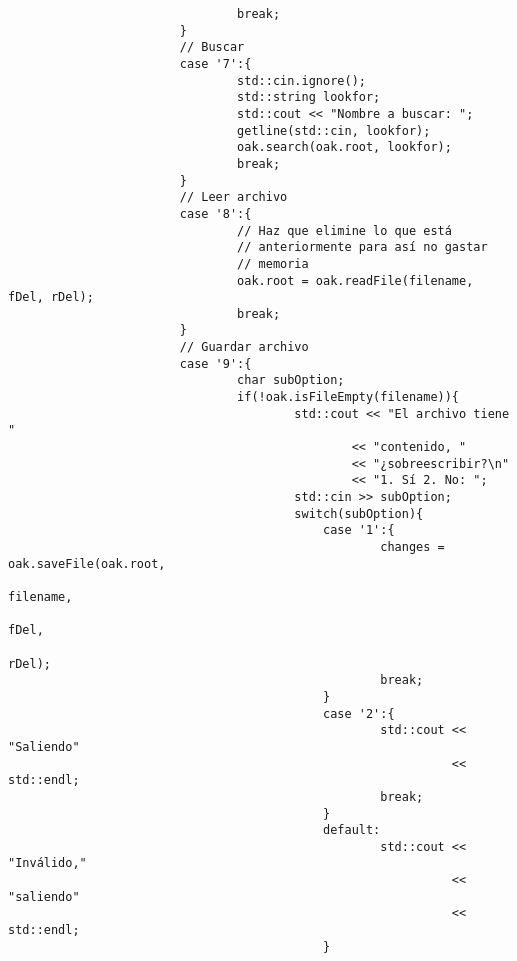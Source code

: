 \documentclass[11pt]{article}
\begin{document}
\begin{verbatim}
                                break;
                        }
                        // Buscar
                        case '7':{
                                std::cin.ignore();
                                std::string lookfor;
                                std::cout << "Nombre a buscar: ";
                                getline(std::cin, lookfor);
                                oak.search(oak.root, lookfor);
                                break;
                        }
                        // Leer archivo
                        case '8':{
                                // Haz que elimine lo que está
                                // anteriormente para así no gastar
                                // memoria
                                oak.root = oak.readFile(filename, fDel, rDel);
                                break;
                        }
                        // Guardar archivo
                        case '9':{
                                char subOption;
                                if(!oak.isFileEmpty(filename)){
                                        std::cout << "El archivo tiene "
                                                << "contenido, "
                                                << "¿sobreescribir?\n"
                                                << "1. Sí 2. No: ";
                                        std::cin >> subOption;
                                        switch(subOption){
                                            case '1':{
                                                    changes = oak.saveFile(oak.root,
                                                                           filename,
                                                                           fDel,
                                                                           rDel);
                                                    break;
                                            }
                                            case '2':{
                                                    std::cout << "Saliendo"
                                                              << std::endl;
                                                    break;
                                            }
                                            default:
                                                    std::cout << "Inválido,"
                                                              << "saliendo"
                                                              << std::endl;
                                            }


\end{verbatim}
\end{document}
